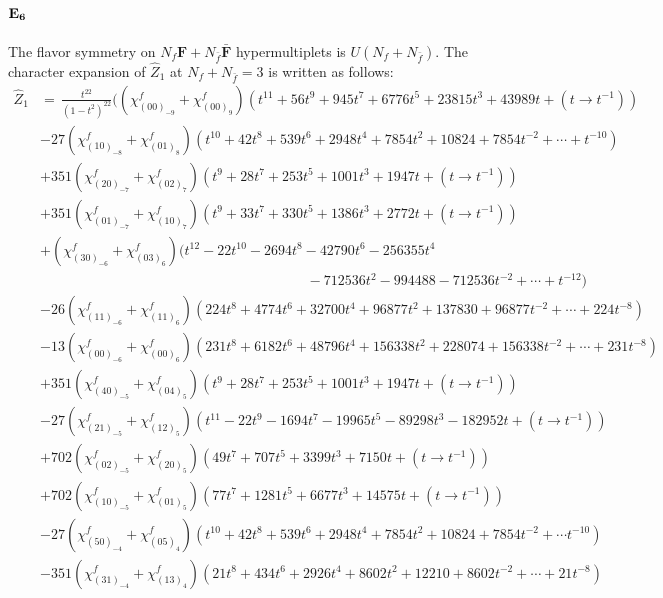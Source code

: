 \documentclass[letterpaper, 11pt]{article}
\newcommand{\nn}{\nonumber}
\begin{document}
{\paragraph{$\bf E_6$}
The flavor symmetry on $N_f\mathbf{F} + N_{\bar{f}}\bar{\mathbf{F}}$ hypermultiplets is $U(N_f + N_{\bar{f}})$. The character expansion of $\hat{Z}_1$ at $N_f+ N_{\bar{f}} = 3$ is written as follows:
  \begin{align}
    \label{eq:E6F3}
    \hat{Z}_1&=\,\frac{t^{22}}{(1-t^2)^{22}}\Big((\chi^f_{(00)_{-9}}+\chi^f_{(00)_9})(t^{11}+56 t^9+945 t^7+6776 t^5+23815 t^3+43989 t+(t\rightarrow t^{-1}))\nn\\
&-27(\chi^f_{(10)_{-8}}+\chi^f_{(01)_8})(t^{10}+42 t^8+539 t^6+2948 t^4+7854 t^2+10824+7854t^{-2}+\cdots+t^{-10})\nn\\
&+351(\chi^f_{(20)_{-7}}+\chi^f_{(02)_7}) (t^9+28 t^7+253 t^5+1001 t^3+1947t+(t\rightarrow t^{-1}))\nn\\
&+351(\chi^f_{(01)_{-7}}+\chi^f_{(10)_7}) (t^9+33 t^7+330 t^5+1386 t^3+2772t+(t\rightarrow t^{-1}))\\
&+(\chi^f_{(30)_{-6}}+\chi^f_{(03)_6})(t^{12}-22 t^{10}-2694 t^8-42790 t^6-256355 t^4\nn\\
&\hspace{8cm}-712536 t^2-994488-712536t^{-2}+\cdots+t^{-12})\nn\\
&-26(\chi^f_{(11)_{-6}}+\chi^f_{(11)_6})(224 t^8+4774 t^6+32700 t^4+96877 t^2+137830+96877t^{-2}+\cdots +224t^{-8})\nn\\
&-13(\chi^f_{(00)_{-6}}+\chi^f_{(00)_6})(231 t^8+6182 t^6+48796 t^4+156338 t^2+228074+156338 t^{-2}+\cdots+231t^{-8})\nn\\
&+351(\chi^f_{(40)_{-5}}+\chi^f_{(04)_5})(t^9+28 t^7+253 t^5+1001 t^3+1947t+(t\rightarrow t^{-1}))\nn\\
&-27(\chi^f_{(21)_{-5}}+\chi^f_{(12)_5})(t^{11}-22 t^9-1694 t^7-19965 t^5-89298 t^3-182952t+(t\rightarrow t^{-1}))\nn\\
&+702(\chi^f_{(02)_{-5}}+\chi^f_{(20)_5})(49 t^7+707 t^5+3399 t^3+7150t+(t\rightarrow t^{-1}))\nn\\
&+702(\chi^f_{(10)_{-5}}+\chi^f_{(01)_5})(77 t^7+1281 t^5+6677 t^3+14575t+(t\rightarrow t^{-1}))\nn\\
&-27(\chi^f_{(50)_{-4}}+\chi^f_{(05)_4})(t^{10}+42 t^8+539 t^6+2948 t^4+7854 t^2+10824+7854t^{-2}+\cdots t^{-10})\nn\\
&-351(\chi^f_{(31)_{-4}}+\chi^f_{(13)_4})(21 t^8+434 t^6+2926 t^4+8602 t^2+12210+8602t^{-2}+\cdots+21t^{-8})\nn\\

\end{align}}
\end{document}
